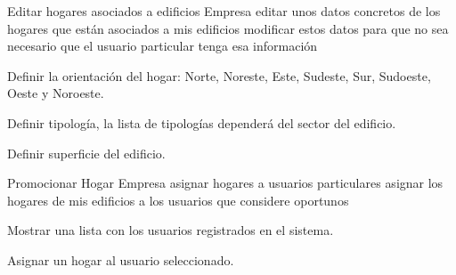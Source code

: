 \historiaDeUsuario
{Editar hogares asociados a edificios}
{Empresa}
{editar unos datos concretos de los hogares que están asociados a mis edificios}
{modificar estos datos para que no sea necesario que el usuario particular tenga esa información}
{
    \item Definir la orientación del hogar: Norte, Noreste, Este, Sudeste, Sur, Sudoeste, Oeste y Noroeste.
    \item Definir tipología, la lista de tipologías dependerá del sector del edificio.
    \item Definir superficie del edificio.
}

\historiaDeUsuario
{Promocionar Hogar}
{Empresa}
{asignar hogares a usuarios particulares}
{asignar los hogares de mis edificios a los usuarios que considere oportunos}
{
    \item Mostrar una lista con los usuarios registrados en el sistema.
    \item Asignar un hogar al usuario seleccionado.
}

\clearpage

    
    
